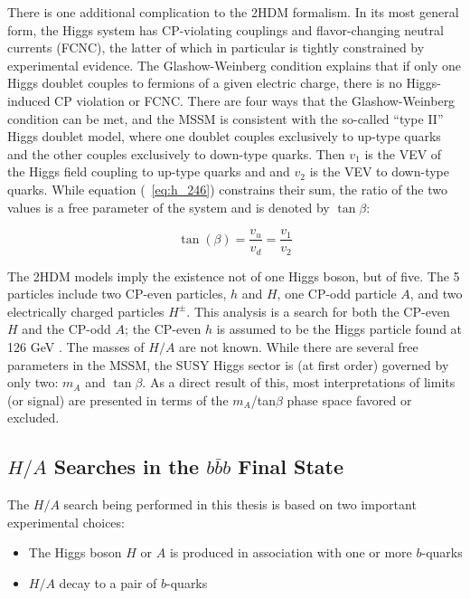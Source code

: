 There is one additional complication to the 2HDM formalism.  In its most general form, 
the Higgs system has CP-violating couplings and flavor-changing neutral currents 
(FCNC), the latter of which in particular is tightly constrained by experimental evidence.  
The Glashow-Weinberg condition explains that if only one Higgs doublet couples to fermions 
of a given electric charge, there is no Higgs-induced CP violation or 
FCNC.  There are four ways that the Glashow-Weinberg condition can be met, 
and the MSSM is consistent with the so-called ``type II'' Higgs 
doublet model, where one doublet couples exclusively to up-type quarks and the 
other couples exclusively to down-type quarks.  Then $v_1$ 
is the VEV of the Higgs field coupling to up-type quarks and and $v_2$ 
is the VEV to down-type quarks.  While equation (~\ref{eq:h_246}) 
constrains their sum, the ratio of the two values is a free parameter of 
the system and is denoted by $\tan\beta$:

\begin{equation}
	\tan(\beta) = \frac{v_u}{v_d} = \frac{v_1}{v_2}
\end{equation}




The 2HDM models imply the existence not of one Higgs boson, but of five.  
The 5 particles include two CP-even particles, $h$ and $H$, 
one CP-odd particle $A$, and two electrically charged particles $H^\pm$.   
This analysis is a search for both the CP-even $H$ and 
the CP-odd $A$; the CP-even $h$ is 
assumed to be the Higgs particle found at 126 GeV \cite{PDG-Review}.  
The masses of $H/A$ are not known.  While there are several free parameters in the MSSM, the SUSY Higgs sector is 
(at first order) governed by only two: $m_A$ 
and $\tan\beta$.  As a direct result of this, most interpretations 
of limits (or signal) are presented in terms of the $m_A$/tan$\beta$ phase space favored or excluded.  




\subsection{$H/A$ Searches in the $b\bar{b}b$ Final State}
The $H/A$ search being performed in this thesis is based on two important experimental choices:

\begin{itemize}
    \item The Higgs boson $H$ or $A$ is produced in association with one or more $b$-quarks
    \item $H/A$ decay to a pair of $b$-quarks
\end{itemize}


